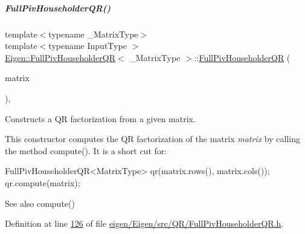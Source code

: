 \mbox{\label{group___q_r___module_aeeace3abca6b215025e94c3e098b0a97}} 
\subparagraph{\texorpdfstring{Full\+Piv\+Householder\+Q\+R()}{FullPivHouseholderQR()}\hspace{0.1cm}{\footnotesize\ttfamily [3/8]}}
{\footnotesize\ttfamily template$<$typename \+\_\+\+Matrix\+Type$>$ \\
template$<$typename Input\+Type $>$ \\
\hyperlink{group___q_r___module_class_eigen_1_1_full_piv_householder_q_r}{Eigen\+::\+Full\+Piv\+Householder\+QR}$<$ \+\_\+\+Matrix\+Type $>$\+::\hyperlink{group___q_r___module_class_eigen_1_1_full_piv_householder_q_r}{Full\+Piv\+Householder\+QR} (\begin{DoxyParamCaption}\item[{const \hyperlink{group___core___module_struct_eigen_1_1_eigen_base}{Eigen\+Base}$<$ Input\+Type $>$ \&}]{matrix }\end{DoxyParamCaption})\hspace{0.3cm}{\ttfamily [inline]}, {\ttfamily [explicit]}}



Constructs a QR factorization from a given matrix. 

This constructor computes the QR factorization of the matrix {\itshape matrix} by calling the method compute(). It is a short cut for\+:


\begin{DoxyCode}
FullPivHouseholderQR<MatrixType> qr(matrix.rows(), matrix.cols());
qr.compute(matrix);
\end{DoxyCode}


\begin{DoxySeeAlso}{See also}
compute() 
\end{DoxySeeAlso}


Definition at line \hyperlink{eigen_2_eigen_2src_2_q_r_2_full_piv_householder_q_r_8h_source_l00126}{126} of file \hyperlink{eigen_2_eigen_2src_2_q_r_2_full_piv_householder_q_r_8h_source}{eigen/\+Eigen/src/\+Q\+R/\+Full\+Piv\+Householder\+Q\+R.\+h}.

